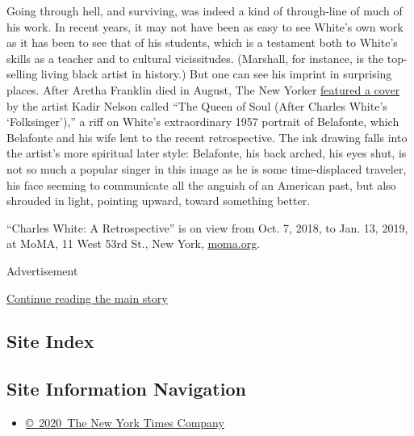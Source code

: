 Going through hell, and surviving, was indeed a kind of through-line of
much of his work. In recent years, it may not have been as easy to see
White's own work as it has been to see that of his students, which is a
testament both to White's skills as a teacher and to cultural
vicissitudes. (Marshall, for instance, is the top-selling living black
artist in history.) But one can see his imprint in surprising places.
After Aretha Franklin died in August, The New Yorker
\href{https://www.newyorker.com/culture/cover-story/cover-story-2018-08-27}{featured
a cover} by the artist Kadir Nelson called ``The Queen of Soul (After
Charles White's `Folksinger'),'' a riff on White's extraordinary 1957
portrait of Belafonte, which Belafonte and his wife lent to the recent
retrospective. The ink drawing falls into the artist's more spiritual
later style: Belafonte, his back arched, his eyes shut, is not so much a
popular singer in this image as he is some time-displaced traveler, his
face seeming to communicate all the anguish of an American past, but
also shrouded in light, pointing upward, toward something better.

``Charles White: A Retrospective'' is on view from Oct. 7, 2018, to Jan.
13, 2019, at MoMA, 11 West 53rd St., New York,
\href{https://www.moma.org/calendar/exhibitions/3930}{moma.org}.

Advertisement

\protect\hyperlink{after-bottom}{Continue reading the main story}

\hypertarget{site-index}{%
\subsection{Site Index}\label{site-index}}

\hypertarget{site-information-navigation}{%
\subsection{Site Information
Navigation}\label{site-information-navigation}}

\begin{itemize}
\tightlist
\item
  \href{https://help.nytimes3xbfgragh.onion/hc/en-us/articles/115014792127-Copyright-notice}{©~2020~The
  New York Times Company}
\end{itemize}

